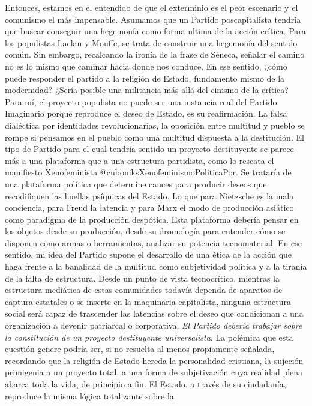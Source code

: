 \documentclass[
]{article}
\begin{document}
Entonces, estamos en el entendido de que el exterminio es el peor
escenario y el comunismo el más impensable. Asumamos que un Partido
poscapitalista tendría que buscar conseguir una hegemonía como forma
ultima de la acción crítica. Para las populistas Laclau y Mouffe, se
trata de construir una hegemonía del sentido común. Sin embargo,
recalcando la ironía de la frase de Séneca, señalar el camino no es lo
mismo que caminar hacia donde nos conduce. En ese sentido, ¿cómo puede
responder el partido a la religión de Estado, fundamento mismo de la
modernidad? ¿Sería posible una militancia más allá del cinismo de la
crítica? Para mí, el proyecto populista no puede ser una instancia real
del Partido Imaginario porque reproduce el deseo de Estado, es su
reafirmación. La falsa dialéctica por identidades revolucionarias, la
oposición entre multitud y pueblo se rompe si pensamos en el pueblo como
una multitud dispuesta a la destitución. El tipo de Partido para el cual
tendría sentido un proyecto destituyente se parece más a una plataforma
que a una estructura partidista, como lo rescata el manifiesto
Xenofeminista @cuboniksXenofeminismoPoliticaPor. Se trataría de una
plataforma política que determine cauces para producir deseos que
recodifiquen las huellas psíquicas del Estado. Lo que para Nietzsche es
la mala conciencia, para Freud la latencia y para Marx el modo de
producción asiático como paradigma de la producción despótica. Esta
plataforma debería pensar en los objetos desde su producción, desde su
dromología para entender cómo se disponen como armas o herramientas,
analizar su potencia tecnomaterial. En ese sentido, mi idea del Partido
supone el desarrollo de una ética de la acción que haga frente a la
banalidad de la multitud como subjetividad política y a la tiranía de la
falta de estructura. Desde un punto de vista tecnocrítico, mientras la
estructura mediática de estas comunidades todavía dependa de aparatos de
captura estatales o se inserte en la maquinaria capitalista, ninguna
estructura social será capaz de trascender las latencias sobre el deseo
que condicionan a una organización a devenir patriarcal o corporativa.
\emph{El Partido debería trabajar sobre la constitución de un proyecto
destituyente universalista}. La polémica que esta cuestión genere podría
ser, si no resuelta al menos propiamente señalada, recordando que la
religión de Estado hereda la personalidad cristiana, la sujeción
primigenia a un proyecto total, a una forma de subjetivación cuya
realidad plena abarca toda la vida, de principio a fin. El Estado, a
través de su ciudadanía, reproduce la misma lógica totalizante sobre la
\end{document}
